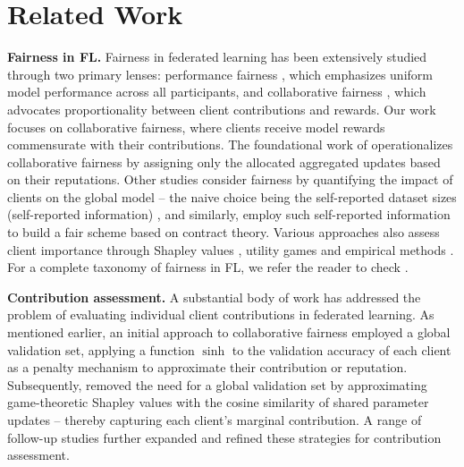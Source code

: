 \section{Related Work}
\label{section: related-work}

\textbf{Fairness in FL.} Fairness in federated learning has been extensively studied through two primary lenses: performance fairness \cite{jiang2023fair}, which emphasizes uniform model performance across all participants, and collaborative fairness \cite{lyu2020collaborative}, which advocates proportionality between client contributions and rewards. Our work focuses on collaborative fairness, where clients receive model rewards commensurate with their contributions. The foundational work of \citet{lyu2020collaborative} operationalizes collaborative fairness by assigning only the allocated aggregated updates based on their reputations. 
Other studies consider fairness by quantifying the impact of clients on the global model -- the naive choice being the self-reported dataset sizes (self-reported information) \cite{donahue2021optimality, zhang2020hierarchicallyfairfederatedlearning}, and similarly, \citet{kang2019incentivedesignforefl} employ such self-reported information to build a fair scheme based on contract theory. Various approaches also assess client importance through Shapley values \cite{shapley_book1952, ghorbani2019datashapley}, utility games \cite{gollapudi2017profitsharing, nishio2009estimationIFL} and empirical methods \cite{kuk2021fedccea}. For a complete taxonomy of fairness in FL, we refer the reader to check \cite{Shi_2024FairnessAwareFL}. 

\textbf{Contribution assessment.} A substantial body of work has addressed the problem of evaluating individual client contributions in federated learning. As mentioned earlier, an initial approach to collaborative fairness \cite{lyu2020collaborative} employed a global validation set, applying a function $\sinh$ to the validation accuracy of each client as a penalty mechanism to approximate their contribution or reputation. Subsequently, \citet{xu2021gradient} removed the need for a global validation set by approximating game-theoretic Shapley values with the cosine similarity of shared parameter updates -- thereby capturing each client's marginal contribution. A range of follow-up studies \cite{shi2022fedfaim, jiang2023fair, Lin2023fairyetasymp, tastan2024redefining} further expanded and refined these strategies for contribution assessment. 


